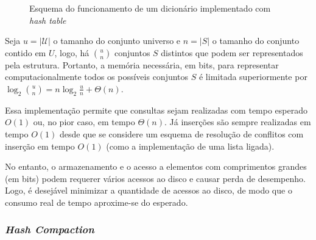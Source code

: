 \documentclass[12pt,twoside,english,brazilian]{article}
\begin{document}
\begin{figure}
    \begin{center}
        \caption{\label{hash-table} Esquema do funcionamento de um dicionário implementado com \textit{hash table}}
    \end{center}
\end{figure}

Seja $u = |\mathcal{U}|$ o tamanho do conjunto universo e $n=|S|$ o tamanho do conjunto contido em $U$, logo, há $\binom{u}{n}$ conjuntos $S$ distintos que podem ser representados pela estrutura. Portanto, a memória necessária, em bits, para representar computacionalmente todos os possíveis conjuntos $S$ é limitada superiormente por $\log_2 \binom{u}{n} = n \log_2 \frac{u}{n} + \Theta(n)$.

Essa implementação permite que consultas sejam realizadas com tempo esperado $O(1)$ ou, no pior caso, em tempo $\Theta(n)$. Já inserções são sempre realizadas em tempo $O(1)$ desde que se considere um esquema de resolução de conflitos com inserção em tempo $O(1)$ (como a implementação de uma lista ligada).

No entanto, o armazenamento e o acesso a elementos com comprimentos grandes (em bits) podem requerer vários acessos ao disco e causar perda de desempenho. Logo, é desejável minimizar a quantidade de acessos ao disco, de modo que o consumo real de tempo aproxime-se do esperado.

\subsubsection{\textit{Hash Compaction}}
\end{document}
